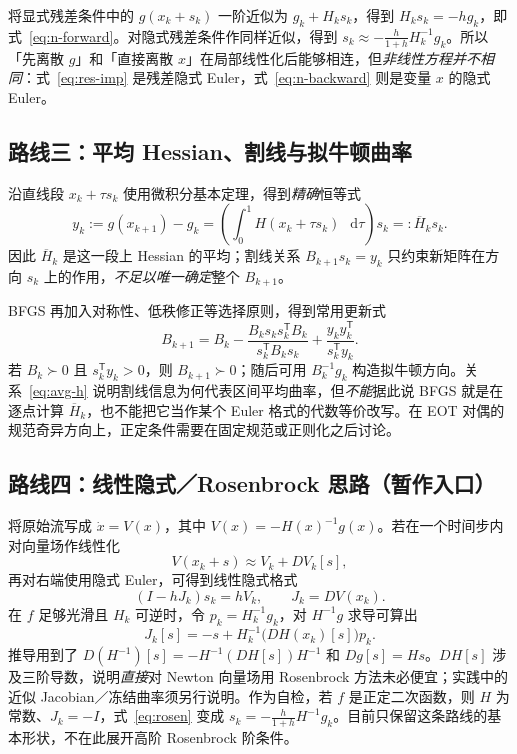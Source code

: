 \documentclass[11pt,a4paper]{ctexart}
\newcommand{\dd}{\mathop{}\!\mathrm d}
\newcommand{\trans}{\mathsf T}
\begin{document}
将显式残差条件中的 $g(x_k+s_k)$ 一阶近似为 $g_k+H_ks_k$，得到 $H_ks_k=-hg_k$，即式~\eqref{eq:n-forward}。对隐式残差条件作同样近似，得到 $s_k\approx-\frac{h}{1+h}H_k^{-1}g_k$。所以「先离散 $g$」和「直接离散 $x$」在局部线性化后能够相连，但\emph{非线性方程并不相同}：式~\eqref{eq:res-imp} 是残差隐式 Euler，式~\eqref{eq:n-backward} 则是变量 $x$ 的隐式 Euler。

\subsection{路线三：平均 Hessian、割线与拟牛顿曲率}
沿直线段 $x_k+\tau s_k$ 使用微积分基本定理，得到\emph{精确}恒等式
\begin{equation}\label{eq:avg-h}
y_k:=g(x_{k+1})-g_k
=\left(\int_0^1H(x_k+\tau s_k)\,\dd\tau\right)s_k
=:\overline H_k s_k.
\end{equation}
因此 $\overline H_k$ 是这一段上 Hessian 的平均；割线关系 $B_{k+1}s_k=y_k$ 只约束新矩阵在方向 $s_k$ 上的作用，\emph{不足以唯一确定}整个 $B_{k+1}$。

BFGS 再加入对称性、低秩修正等选择原则，得到常用更新式
\begin{equation}\label{eq:bfgs}
B_{k+1}=B_k-\frac{B_ks_ks_k^{\trans}B_k}{s_k^{\trans}B_ks_k}
+\frac{y_ky_k^{\trans}}{s_k^{\trans}y_k}.
\end{equation}
若 $B_k\succ0$ 且 $s_k^{\trans}y_k>0$，则 $B_{k+1}\succ0$；随后可用 $B_k^{-1}g_k$ 构造拟牛顿方向。关系~\eqref{eq:avg-h} 说明割线信息为何代表区间平均曲率，但\emph{不能}据此说 BFGS 就是在逐点计算 $\overline H_k$，也不能把它当作某个 Euler 格式的代数等价改写。在 EOT 对偶的规范奇异方向上，正定条件需要在固定规范或正则化之后讨论。

\subsection{路线四：线性隐式／Rosenbrock 思路（暂作入口）}
将原始流写成 $\dot x=V(x)$，其中 $V(x)=-H(x)^{-1}g(x)$。若在一个时间步内对向量场作线性化
\[
V(x_k+s)\approx V_k+DV_k[s],
\]
再对右端使用隐式 Euler，可得到线性隐式格式
\begin{equation}\label{eq:rosen}
(I-hJ_k)s_k=hV_k,\qquad J_k=DV(x_k).
\end{equation}
在 $f$ 足够光滑且 $H_k$ 可逆时，令 $p_k=H_k^{-1}g_k$，对 $H^{-1}g$ 求导可算出
\begin{equation}\label{eq:jv}
J_k[s]=-s+H_k^{-1}\bigl(DH(x_k)[s]\bigr)p_k.
\end{equation}
推导用到了 $D(H^{-1})[s]=-H^{-1}(DH[s])H^{-1}$ 和 $Dg[s]=Hs$。$DH[s]$ 涉及三阶导数，说明\emph{直接}对 Newton 向量场用 Rosenbrock 方法未必便宜；实践中的近似 Jacobian／冻结曲率须另行说明。作为自检，若 $f$ 是正定二次函数，则 $H$ 为常数、$J_k=-I$，式~\eqref{eq:rosen} 变成 $s_k=-\frac{h}{1+h}H^{-1}g_k$。目前只保留这条路线的基本形状，不在此展开高阶 Rosenbrock 阶条件。
\end{document}
